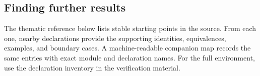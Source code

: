 \documentclass[11pt]{article}
\begin{document}
\subsection{Finding further results}
The thematic reference below lists stable starting points in the source. From each one, nearby declarations provide the supporting identities, equivalences, examples, and boundary cases. A machine-readable companion map records the same entries with exact module and declaration names. For the full environment, use the declaration inventory in the verification material.

\end{document}
